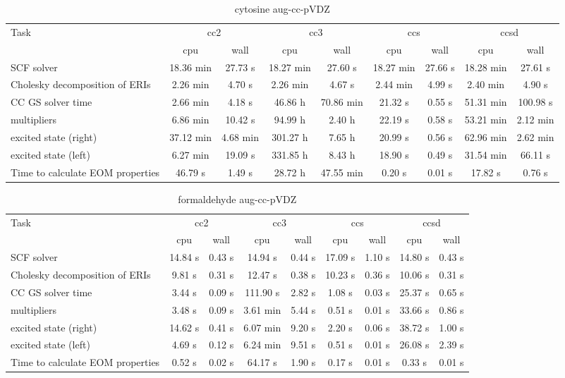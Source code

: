 \documentclass{article}
\begin{document}
\begin{table}
\caption{cytosine aug-cc-pVDZ}
\begin{tabular}{lcccccccc}
\toprule
Task & \multicolumn{2}{c}{cc2} & \multicolumn{2}{c}{cc3} & \multicolumn{2}{c}{ccs} & \multicolumn{2}{c}{ccsd}\\
\cmidrule(lr){2-3}\cmidrule(lr){4-5}\cmidrule(lr){6-7}\cmidrule(lr){8-9}
 & cpu & wall & cpu & wall & cpu & wall & cpu & wall\\
\midrule
SCF solver & 18.36 min & 27.73 s & 18.27 min & 27.60 s & 18.27 min & 27.66 s & 18.28 min & 27.61 s\\
Cholesky decomposition of ERIs & 2.26 min & 4.70 s & 2.26 min & 4.67 s & 2.44 min & 4.99 s & 2.40 min & 4.90 s\\
CC GS solver time & 2.66 min & 4.18 s & 46.86 h & 70.86 min & 21.32 s & 0.55 s & 51.31 min & 100.98 s\\
multipliers & 6.86 min & 10.42 s & 94.99 h & 2.40 h & 22.19 s & 0.58 s & 53.21 min & 2.12 min\\
excited state (right) & 37.12 min & 4.68 min & 301.27 h & 7.65 h & 20.99 s & 0.56 s & 62.96 min & 2.62 min\\
excited state (left) & 6.27 min & 19.09 s & 331.85 h & 8.43 h & 18.90 s & 0.49 s & 31.54 min & 66.11 s\\
Time to calculate EOM properties & 46.79 s & 1.49 s & 28.72 h & 47.55 min & 0.20 s & 0.01 s & 17.82 s & 0.76 s\\
\bottomrule
\end{tabular}
\end{table}
\begin{table}
\caption{formaldehyde aug-cc-pVDZ}
\begin{tabular}{lcccccccc}
\toprule
Task & \multicolumn{2}{c}{cc2} & \multicolumn{2}{c}{cc3} & \multicolumn{2}{c}{ccs} & \multicolumn{2}{c}{ccsd}\\
\cmidrule(lr){2-3}\cmidrule(lr){4-5}\cmidrule(lr){6-7}\cmidrule(lr){8-9}
 & cpu & wall & cpu & wall & cpu & wall & cpu & wall\\
\midrule
SCF solver & 14.84 s & 0.43 s & 14.94 s & 0.44 s & 17.09 s & 1.10 s & 14.80 s & 0.43 s\\
Cholesky decomposition of ERIs & 9.81 s & 0.31 s & 12.47 s & 0.38 s & 10.23 s & 0.36 s & 10.06 s & 0.31 s\\
CC GS solver time & 3.44 s & 0.09 s & 111.90 s & 2.82 s & 1.08 s & 0.03 s & 25.37 s & 0.65 s\\
multipliers & 3.48 s & 0.09 s & 3.61 min & 5.44 s & 0.51 s & 0.01 s & 33.66 s & 0.86 s\\
excited state (right) & 14.62 s & 0.41 s & 6.07 min & 9.20 s & 2.20 s & 0.06 s & 38.72 s & 1.00 s\\
excited state (left) & 4.69 s & 0.12 s & 6.24 min & 9.51 s & 0.51 s & 0.01 s & 26.08 s & 2.39 s\\
Time to calculate EOM properties & 0.52 s & 0.02 s & 64.17 s & 1.90 s & 0.17 s & 0.01 s & 0.33 s & 0.01 s\\
\bottomrule
\end{tabular}
\end{table}
\end{document}
